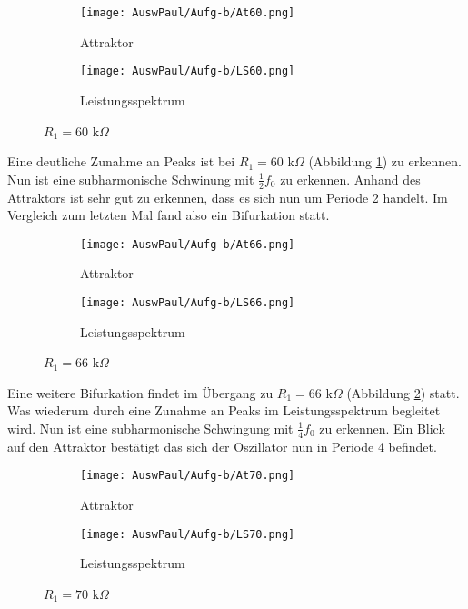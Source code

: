\begin{figure}[h]
    \centering
    \begin{subfigure}[b]{0.45\textwidth}
        \centering
        \texttt{[image: AuswPaul/Aufg-b/At60.png]}
        \caption{Attraktor}
    \end{subfigure}
    \hfill
    \begin{subfigure}[b]{0.45\textwidth}
        \centering
        \texttt{[image: AuswPaul/Aufg-b/LS60.png]}
        \caption{Leistungsspektrum}
    \end{subfigure}
    \caption{$R_1 = 60$ k$\Omega$}
    \label{fig:A60}
\end{figure}

Eine deutliche Zunahme an Peaks ist bei $R_1 = 60$ k$\Omega$ (Abbildung \ref{fig:A60}) zu erkennen. Nun ist eine subharmonische Schwinung mit $\frac{1}{2} f_0$ zu erkennen. Anhand des Attraktors ist sehr gut zu erkennen, dass es sich nun um Periode 2 handelt. Im Vergleich zum letzten Mal fand also ein Bifurkation statt.

\begin{figure}[h]
    \centering
    \begin{subfigure}[b]{0.45\textwidth}
        \centering
        \texttt{[image: AuswPaul/Aufg-b/At66.png]}
        \caption{Attraktor}
    \end{subfigure}
    \hfill
    \begin{subfigure}[b]{0.45\textwidth}
        \centering
        \texttt{[image: AuswPaul/Aufg-b/LS66.png]}
        \caption{Leistungsspektrum}
    \end{subfigure}
    \caption{$R_1 = 66$ k$\Omega$}
    \label{fig:A66}
\end{figure}

Eine weitere Bifurkation findet im Übergang zu $R_1 = 66$ k$\Omega$ (Abbildung \ref{fig:A66}) statt. Was wiederum durch eine Zunahme an Peaks im Leistungsspektrum begleitet wird. Nun ist eine subharmonische Schwingung mit $\frac{1}{4} f_0$ zu erkennen. Ein Blick auf den Attraktor bestätigt das sich der Oszillator nun in Periode 4 befindet.
\newpage
\begin{figure}[h]
    \centering
    \begin{subfigure}[b]{0.45\textwidth}
        \centering
        \texttt{[image: AuswPaul/Aufg-b/At70.png]}
        \caption{Attraktor}
    \end{subfigure}
    \hfill
    \begin{subfigure}[b]{0.45\textwidth}
        \centering
        \texttt{[image: AuswPaul/Aufg-b/LS70.png]}
        \caption{Leistungsspektrum}
    \end{subfigure}
    \caption{$R_1 = 70$ k$\Omega$}
    \label{fig:A70}
\end{figure}

